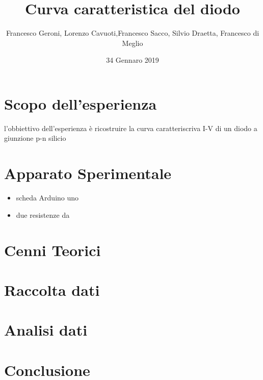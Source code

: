 \documentclass{exam}
\date{34 Gennaro 2019}
\title{Curva caratteristica del diodo}
\author{Francesco Geroni, Lorenzo Cavuoti,Francesco Sacco, Silvio Draetta, Francesco di Meglio}
\begin{document}
	\maketitle
	\section{Scopo dell'esperienza}
		l'obbiettivo dell'esperienza è ricostruire la curva caratteriscriva I-V di un diodo a giunzione p-n silicio
	\section{Apparato Sperimentale}
		\begin{itemize}
			\item scheda Arduino uno
			\item due resistenze da 
		\end{itemize}
	\section{Cenni Teorici}
	\section{Raccolta dati}
	\section{Analisi dati}
	\section{Conclusione}
\end{document}
